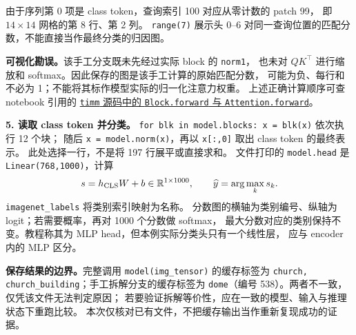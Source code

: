 由于序列第 0 项是 class token，查询索引 100 对应从零计数的 patch 99，
即 $14\times14$ 网格的第 8 行、第 2 列。
\texttt{range(7)} 展示头 0--6 对同一查询位置的匹配分数，不能直接当作最终分类的归因图。

\textbf{可视化勘误。}该手工分支既未先经过实际 block 的 \texttt{norm1}，
也未对 $QK^\top$ 进行缩放和 softmax。因此保存的图是该手工计算的原始匹配分数，
可能为负、每行和不必为 1；不能将其标作模型实际的归一化注意力权重。
上述正确计算顺序可查 notebook 引用的
\href{https://github.com/huggingface/pytorch-image-models/blob/198f6ea0f3dae13f041f3ea5880dd79089b60d61/timm/models/vision_transformer.py}
{\texttt{timm} 源码中的 \texttt{Block.forward} 与 \texttt{Attention.forward}}。

\textbf{5. 读取 class token 并分类。}
\texttt{for blk in model.blocks: x = blk(x)} 依次执行 12 个块；
随后 \texttt{x = model.norm(x)}，再以 \texttt{x[:,0]} 取出 class token 的最终表示。
此处选择一行，不是将 197 行展平或直接求和。
文件打印的 \texttt{model.head} 是 \texttt{Linear(768,1000)}，计算
\[
 s=h_{\rm CLS}W+b\in\mathbb R^{1\times1000},\qquad
 \widehat y=\arg\max_k s_k.
\]
\texttt{imagenet\_labels} 将类别索引映射为名称。
分数图的横轴为类别编号、纵轴为 logit；若需要概率，再对 1000 个分数做 softmax，
最大分数对应的类别保持不变。教程称其为 MLP head，但本例实际分类头只有一个线性层，
应与 encoder 内的 MLP 区分。

\textbf{保存结果的边界。}完整调用 \texttt{model(img\_tensor)} 的缓存标签为
\texttt{church, church\_building}；手工拆解分支的缓存标签为
\texttt{dome}（编号 538）。两者不一致，仅凭该文件无法判定原因；
若要验证拆解等价性，应在一致的模型、输入与推理状态下重跑比较。
本次仅核对已有文件，不把缓存输出当作重新复现成功的证据。
\endgroup
